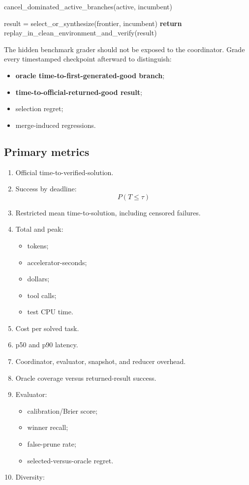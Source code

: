 \documentclass[
  letterpaper,
]{article}
\newenvironment{Shaded}{}{}
\newcommand{\ControlFlowTok}[1]{\textcolor[rgb]{0.00,0.44,0.13}{\textbf{#1}}}
\newcommand{\NormalTok}[1]{#1}
\newcommand{\OperatorTok}[1]{\textcolor[rgb]{0.40,0.40,0.40}{#1}}
\providecommand{\tightlist}{%
  \setlength{\itemsep}{0pt}\setlength{\parskip}{0pt}}
\begin{document}
\begin{Shaded}
\begin{Highlighting}[]
\NormalTok{        cancel\_dominated\_active\_branches(active, incumbent)}

\NormalTok{    result }\OperatorTok{=}\NormalTok{ select\_or\_synthesize(frontier, incumbent)}
    \ControlFlowTok{return}\NormalTok{ replay\_in\_clean\_environment\_and\_verify(result)}
\end{Highlighting}
\end{Shaded}

The hidden benchmark grader should not be exposed to the coordinator. Grade every timestamped checkpoint afterward to distinguish:

\begin{itemize}
\tightlist
\item
  \textbf{oracle time-to-first-generated-good branch};
\item
  \textbf{time-to-official-returned-good result};
\item
  selection regret;
\item
  merge-induced regressions.
\end{itemize}

\subsection{Primary metrics}\label{primary-metrics}

\begin{enumerate}
\def\labelenumi{\arabic{enumi}.}
\tightlist
\item
  Official time-to-verified-solution.
\item
  Success by deadline:
  \[
  P(T\le\tau)
  \]
\item
  Restricted mean time-to-solution, including censored failures.
\item
  Total and peak:

  \begin{itemize}
  \tightlist
  \item
    tokens;
  \item
    accelerator-seconds;
  \item
    dollars;
  \item
    tool calls;
  \item
    test CPU time.
  \end{itemize}
\item
  Cost per solved task.
\item
  p50 and p90 latency.
\item
  Coordinator, evaluator, snapshot, and reducer overhead.
\item
  Oracle coverage versus returned-result success.
\item
  Evaluator:

  \begin{itemize}
  \tightlist
  \item
    calibration/Brier score;
  \item
    winner recall;
  \item
    false-prune rate;
  \item
    selected-versus-oracle regret.
  \end{itemize}
\item
  Diversity:
\end{enumerate}
\end{document}
